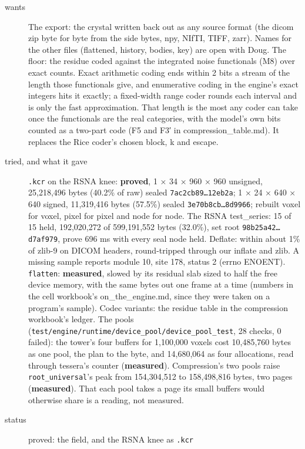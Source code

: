 \begin{description}
\item[{wants}] The export: the crystal written back out as any source format (the dicom zip byte for byte from the side bytes, npy, NIfTI, TIFF, zarr). Names for the other files (flattened, history, bodies, key) are open with Doug. The floor: the residue coded against the integrated noise functionals (M8) over exact counts. Exact arithmetic coding ends within 2 bits a stream of the length those functionals give, and enumerative coding in the engine's exact integers hits it exactly; a fixed-width range coder rounds each interval and is only the fast approximation. That length is the most any coder can take once the functionals are the real categories, with the model's own bits counted as a two-part code (F5 and F3′ in compression\_\allowbreak{}table.md). It replaces the Rice coder's chosen block, k and escape.
\item[{tried, and what it gave}] \texttt{.\allowbreak{}kcr} on the RSNA knee: \textbf{proved}, 1 × 34 × 960 × 960 unsigned, 25,218,496 bytes (40.2\% of raw) sealed \texttt{7ac2cb89…12eb2a}; 1 × 24 × 640 × 640 signed, 11,319,416 bytes (57.5\%) sealed \texttt{3e70b8cb…8d9966}; rebuilt voxel for voxel, pixel for pixel and node for node. The RSNA test\_\allowbreak{}series: 15 of 15 held, 192,020,272 of 599,191,552 bytes (32.0\%), set root \texttt{98b25a42…d7af979}, prove 696 ms with every seal node held. Deflate: within about 1\% of zlib-9 on DICOM headers, round-tripped through our inflate and zlib. A missing sample reports module 10, site 178, status 2 (errno ENOENT). \texttt{flatten}: \textbf{measured}, slowed by its residual slab sized to half the free device memory, with the same bytes out one frame at a time (numbers in the cell workbook's on\_\allowbreak{}the\_\allowbreak{}engine.md, since they were taken on a program's sample). Codec variants: the residue table in the compression workbook's ledger. The pools (\texttt{test/\allowbreak{}engine/\allowbreak{}runtime/\allowbreak{}device\_\allowbreak{}pool/\allowbreak{}device\_\allowbreak{}pool\_\allowbreak{}test}, 28 checks, 0 failed): the tower's four buffers for 1,100,000 voxels cost 10,485,760 bytes as one pool, the plan to the byte, and 14,680,064 as four allocations, read through tessera's counter (\textbf{measured}). Compression's two pools raise \texttt{root\_\allowbreak{}universal}'s peak from 154,304,512 to 158,498,816 bytes, two pages (\textbf{measured}). That each pool takes a page its small buffers would otherwise share is a reading, not measured.
\item[{status}] proved: the field, and the RSNA knee as \texttt{.\allowbreak{}kcr}

\end{description}
